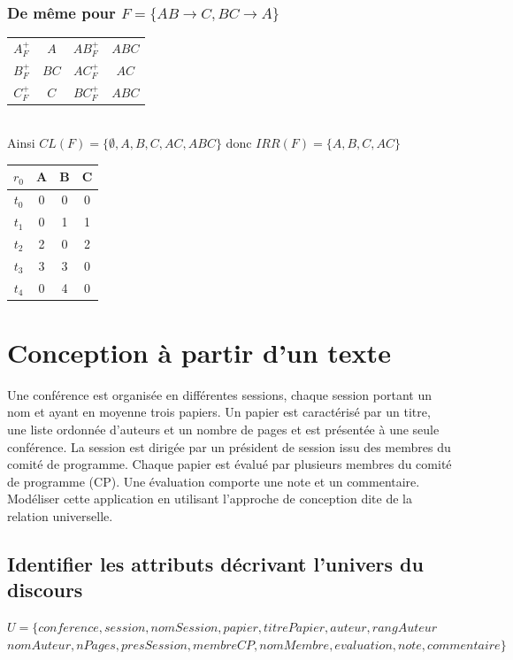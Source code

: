 \documentclass[10pt,a4paper,twoside]{article}
\begin{document}
\subsubsection{De même pour $F=\{AB \rightarrow C, BC \rightarrow A\}$}
\begin{tabular}{c|c||c|c}
$A^{+}_{F}$ & $A$ & $AB^{+}_{F}$ & $ABC$ \\ 
$B^{+}_{F}$ & $BC$ & $AC^{+}_{F}$ & $AC$ \\ 
$C^{+}_{F}$ & $C$ & $BC^{+}_{F}$ & $ABC$ \\ 
\end{tabular} \\

Ainsi $CL(F)=\{\emptyset,A,B,C,AC,ABC\}$ donc $IRR(F)=\{A,B,C,AC\}$\\

\begin{tabular}{c|ccc}
$r_{0}$ & A & B & C \\ 
\hline 
$t_{0}$ & 0 & 0 & 0 \\ 
$t_{1}$ & 0 & 1 & 1 \\ 
$t_{2}$ & 2 & 0 & 2 \\ 
$t_{3}$ & 3 & 3 & 0 \\ 
$t_{4}$ & 0 & 4 & 0 \\ 
\end{tabular} 

\section{Conception à partir d'un texte}
Une conférence est organisée en différentes sessions, chaque session portant un nom et ayant en moyenne trois papiers. Un papier est caractérisé par un titre, une liste ordonnée d'auteurs et un nombre de pages et est présentée à une seule conférence. La session est dirigée par un président de session issu des membres du comité de programme. Chaque papier est évalué par plusieurs membres du comité de programme (CP). Une évaluation comporte une note et un commentaire.\\
Modéliser cette application en utilisant l'approche de conception dite de la relation universelle.

\subsection{Identifier les attributs décrivant l'univers du discours}
$U=\{conference, session, nomSession, papier, titrePapier, auteur, rangAuteur$\\
 $ nomAuteur, nPages, presSession, membreCP, nomMembre, evaluation, note, commentaire\}$
\end{document}
